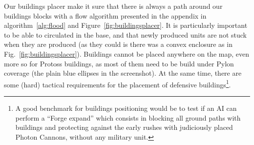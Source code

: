 Our buildings placer make it sure that there is always a path around our buildings blocks with a flow algorithm presented in the appendix in algorithm~\ref{alg:flood} and Figure~\ref{fig:buildingsplacer}. It is particularly important to be able to circulated in the base, and that newly produced units are not stuck when they are produced (as they could is there was a convex enclosure as in Fig.~\ref{fig:buildingsplacer}). Buildings cannot be placed anywhere on the map, even more so for Protoss buildings, as most of them need to be build under Pylon coverage (the plain blue ellipses in the screenshot). At the same time, there are some (hard) tactical requirements for the placement of defensive buildings\footnote{A good benchmark for buildings positioning would be to test if an AI can perform a ``Forge expand'' which consists in blocking all ground paths with buildings and protecting against the early rushes with judiciously placed Photon Cannons, without any military unit.}. 

